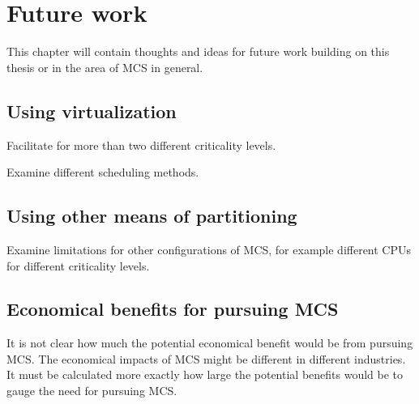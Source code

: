 \chapter{Future work}
This chapter will contain thoughts and ideas for future work building on this thesis or in the area of MCS in general.

\section{Using virtualization}
Facilitate for more than two different criticality levels.

Examine different scheduling methods. %

\section{Using other means of partitioning}
Examine limitations for other configurations of MCS, for example different CPUs for different criticality levels.

\section{Economical benefits for pursuing MCS}
It is not clear how much the potential economical benefit would be from pursuing MCS. The economical impacts of MCS might be different in different industries. It must be calculated more exactly how large the potential benefits would be to gauge the need for pursuing MCS.